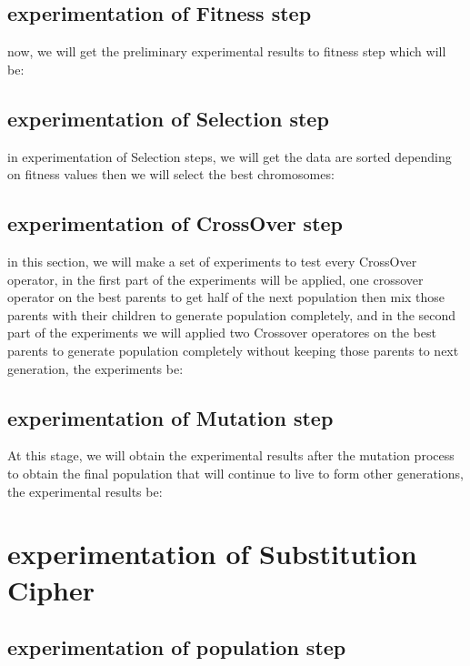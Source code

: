 \subsection{experimentation of Fitness step}
now, we will get the preliminary experimental results to fitness step which will be:\\


\newpage
\subsection{experimentation of Selection step}
in experimentation of Selection steps, we will get the data are sorted depending on fitness values then we will select the best chromosomes:


\newpage
\subsection{experimentation of CrossOver step}
in this section, we will make a set of experiments to test every CrossOver operator, in the first part of the experiments will be applied, one crossover operator on the best parents to get half of the next population then mix those parents with their children to generate population completely, and in the second part of the experiments we will applied two Crossover operatores on the best parents  to generate population completely without keeping those parents to next generation, the experiments be:\\


\newpage
\subsection{experimentation of Mutation step}
At this stage, we will obtain the experimental results after the mutation process to obtain the final population that will continue to live to form other generations, the experimental results be:\\


\newpage


\section{experimentation of Substitution Cipher}
\subsection{experimentation of population step}
